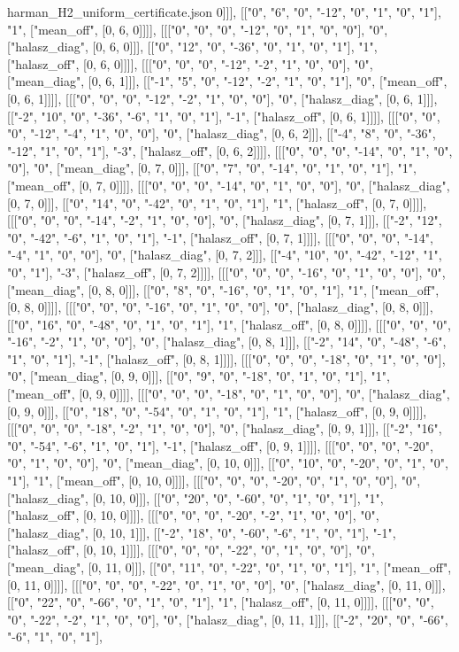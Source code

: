 \begin{filecontents*}[overwrite]{harman_H2_uniform_certificate.json}
0]]], [["0", "6", "0", "-12", "0", "1", "0", "1"], "1", ["mean_off", [0, 6, 0]]]], [[["0", "0", "0", "-12", "0", "1", "0", "0"], "0", ["halasz_diag", [0, 6, 0]]], [["0", "12", "0", "-36", "0", "1", "0", "1"], "1", ["halasz_off", [0, 6, 0]]]], [[["0", "0", "0", "-12", "-2", "1", "0", "0"], "0", ["mean_diag", [0, 6, 1]]], [["-1", "5", "0", "-12", "-2", "1", "0", "1"], "0", ["mean_off", [0, 6, 1]]]], [[["0", "0", "0", "-12", "-2", "1", "0", "0"], "0", ["halasz_diag", [0, 6, 1]]], [["-2", "10", "0", "-36", "-6", "1", "0", "1"], "-1", ["halasz_off", [0, 6, 1]]]], [[["0", "0", "0", "-12", "-4", "1", "0", "0"], "0", ["halasz_diag", [0, 6, 2]]], [["-4", "8", "0", "-36", "-12", "1", "0", "1"], "-3", ["halasz_off", [0, 6, 2]]]], [[["0", "0", "0", "-14", "0", "1", "0", "0"], "0", ["mean_diag", [0, 7, 0]]], [["0", "7", "0", "-14", "0", "1", "0", "1"], "1", ["mean_off", [0, 7, 0]]]], [[["0", "0", "0", "-14", "0", "1", "0", "0"], "0", ["halasz_diag", [0, 7, 0]]], [["0", "14", "0", "-42", "0", "1", "0", "1"], "1", ["halasz_off", [0, 7, 0]]]], [[["0", "0", "0", "-14", "-2", "1", "0", "0"], "0", ["halasz_diag", [0, 7, 1]]], [["-2", "12", "0", "-42", "-6", "1", "0", "1"], "-1", ["halasz_off", [0, 7, 1]]]], [[["0", "0", "0", "-14", "-4", "1", "0", "0"], "0", ["halasz_diag", [0, 7, 2]]], [["-4", "10", "0", "-42", "-12", "1", "0", "1"], "-3", ["halasz_off", [0, 7, 2]]]], [[["0", "0", "0", "-16", "0", "1", "0", "0"], "0", ["mean_diag", [0, 8, 0]]], [["0", "8", "0", "-16", "0", "1", "0", "1"], "1", ["mean_off", [0, 8, 0]]]], [[["0", "0", "0", "-16", "0", "1", "0", "0"], "0", ["halasz_diag", [0, 8, 0]]], [["0", "16", "0", "-48", "0", "1", "0", "1"], "1", ["halasz_off", [0, 8, 0]]]], [[["0", "0", "0", "-16", "-2", "1", "0", "0"], "0", ["halasz_diag", [0, 8, 1]]], [["-2", "14", "0", "-48", "-6", "1", "0", "1"], "-1", ["halasz_off", [0, 8, 1]]]], [[["0", "0", "0", "-18", "0", "1", "0", "0"], "0", ["mean_diag", [0, 9, 0]]], [["0", "9", "0", "-18", "0", "1", "0", "1"], "1", ["mean_off", [0, 9, 0]]]], [[["0", "0", "0", "-18", "0", "1", "0", "0"], "0", ["halasz_diag", [0, 9, 0]]], [["0", "18", "0", "-54", "0", "1", "0", "1"], "1", ["halasz_off", [0, 9, 0]]]], [[["0", "0", "0", "-18", "-2", "1", "0", "0"], "0", ["halasz_diag", [0, 9, 1]]], [["-2", "16", "0", "-54", "-6", "1", "0", "1"], "-1", ["halasz_off", [0, 9, 1]]]], [[["0", "0", "0", "-20", "0", "1", "0", "0"], "0", ["mean_diag", [0, 10, 0]]], [["0", "10", "0", "-20", "0", "1", "0", "1"], "1", ["mean_off", [0, 10, 0]]]], [[["0", "0", "0", "-20", "0", "1", "0", "0"], "0", ["halasz_diag", [0, 10, 0]]], [["0", "20", "0", "-60", "0", "1", "0", "1"], "1", ["halasz_off", [0, 10, 0]]]], [[["0", "0", "0", "-20", "-2", "1", "0", "0"], "0", ["halasz_diag", [0, 10, 1]]], [["-2", "18", "0", "-60", "-6", "1", "0", "1"], "-1", ["halasz_off", [0, 10, 1]]]], [[["0", "0", "0", "-22", "0", "1", "0", "0"], "0", ["mean_diag", [0, 11, 0]]], [["0", "11", "0", "-22", "0", "1", "0", "1"], "1", ["mean_off", [0, 11, 0]]]], [[["0", "0", "0", "-22", "0", "1", "0", "0"], "0", ["halasz_diag", [0, 11, 0]]], [["0", "22", "0", "-66", "0", "1", "0", "1"], "1", ["halasz_off", [0, 11, 0]]]], [[["0", "0", "0", "-22", "-2", "1", "0", "0"], "0", ["halasz_diag", [0, 11, 1]]], [["-2", "20", "0", "-66", "-6", "1", "0", "1"], 
\end{filecontents*}
